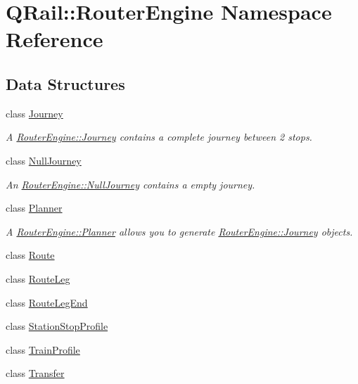 \hypertarget{namespaceQRail_1_1RouterEngine}{}\section{Q\+Rail\+::Router\+Engine Namespace Reference}
\label{namespaceQRail_1_1RouterEngine}
\subsection*{Data Structures}
\begin{DoxyCompactItemize}
\item 
class \mbox{\hyperlink{classQRail_1_1RouterEngine_1_1Journey}{Journey}}
\begin{DoxyCompactList}\small\item\em A \mbox{\hyperlink{classQRail_1_1RouterEngine_1_1Journey}{Router\+Engine\+::\+Journey}} contains a complete journey between 2 stops. \end{DoxyCompactList}\item 
class \mbox{\hyperlink{classQRail_1_1RouterEngine_1_1NullJourney}{Null\+Journey}}
\begin{DoxyCompactList}\small\item\em An \mbox{\hyperlink{classQRail_1_1RouterEngine_1_1NullJourney}{Router\+Engine\+::\+Null\+Journey}} contains a empty journey. \end{DoxyCompactList}\item 
class \mbox{\hyperlink{classQRail_1_1RouterEngine_1_1Planner}{Planner}}
\begin{DoxyCompactList}\small\item\em A \mbox{\hyperlink{classQRail_1_1RouterEngine_1_1Planner}{Router\+Engine\+::\+Planner}} allows you to generate \mbox{\hyperlink{classQRail_1_1RouterEngine_1_1Journey}{Router\+Engine\+::\+Journey}} objects. \end{DoxyCompactList}\item 
class \mbox{\hyperlink{classQRail_1_1RouterEngine_1_1Route}{Route}}
\item 
class \mbox{\hyperlink{classQRail_1_1RouterEngine_1_1RouteLeg}{Route\+Leg}}
\item 
class \mbox{\hyperlink{classQRail_1_1RouterEngine_1_1RouteLegEnd}{Route\+Leg\+End}}
\item 
class \mbox{\hyperlink{classQRail_1_1RouterEngine_1_1StationStopProfile}{Station\+Stop\+Profile}}
\item 
class \mbox{\hyperlink{classQRail_1_1RouterEngine_1_1TrainProfile}{Train\+Profile}}
\item 
class \mbox{\hyperlink{classQRail_1_1RouterEngine_1_1Transfer}{Transfer}}
\end{DoxyCompactItemize}
